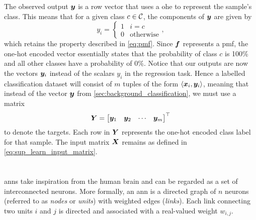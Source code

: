 \documentclass[../main.tex]{subfiles}
\begin{document}
The observed output ${\bm{y}}$ is a row vector that uses a \gls{ohe} to represent the sample's class. 
This means that for a given class $c \in {\mathcal{C}}$, the components of ${\bm{y}}$ are given by
\begin{equation*}
    y_i = \begin{cases}
        1 & i=c \\
        0 & \text{otherwise}
    \end{cases},
\end{equation*}
which retains the property described in \cref{eq:pmf}.
Since ${\bm{f}}$ represents a \gls{pmf}, the one-hot encoded vector essentially states that the probability of class $c$ is 100\% and all other classes have a probability of 0\%.
Notice that our outputs are now the vectors ${\bm{y}}_i$ instead of the scalars $y_i$ in the regression task.
Hence a labelled classification dataset will consist of $m$ tuples of the form $\langle {\bm{x}}_i,{\bm{y}}_i \rangle$, meaning that instead of the vector ${\bm{y}}$ from \cref{sec:background_classification}, we must use a matrix
\begin{equation}
    {\bm{Y}} = \begin{bmatrix}
        {\bm{y}}_1 & {\bm{y}}_2 & \cdots & {\bm{y}}_m
    \end{bmatrix}^\top
\end{equation}
to denote the targets.
Each row in ${\bm{Y}}$ represents the one-hot encoded class label for that sample. 
The input matrix ${\bm{X}}$ remains as defined in \cref{eq:sup_learn_input_matrix}.

\section{}
\label{sec:ann}
\Glspl{ann} take inspiration from the human brain and can be regarded as a set of interconnected neurons. 
More formally, an \gls{ann} is a directed graph of $n$ neurons (referred to as \emph{nodes} or \emph{units}) with weighted edges (\emph{links}).
Each link connecting two units $i$ and $j$ is directed and associated with a real-valued weight $w_{i,j}$. 
\end{document}
